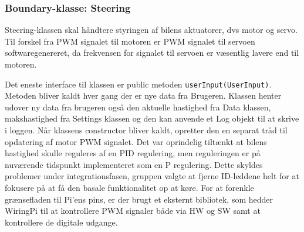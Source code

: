 \subsubsection{Boundary-klasse: Steering} 

Steering-klassen skal håndtere styringen af bilens aktuatorer, dvs motor og servo. 
Til forskel fra PWM signalet til motoren er PWM signalet til servoen softwaregenereret, da frekvensen for signalet til servoen er væsentlig lavere end til motoren.

Det eneste interface til klassen er public metoden \texttt{userInput(UserInput)}. 
Metoden bliver kaldt hver gang der er nye data fra Brugeren. 
Klassen henter udover ny data fra brugeren også den aktuelle hastighed fra Data klassen, makshastighed fra Settings klassen og den kan anvende et Log objekt til at skrive i loggen.
Når klassens constructor bliver kaldt, opretter den en separat tråd til opdatering af motor PWM signalet. 
Det var oprindelig tiltænkt at bilens hastighed skulle reguleres af en PID regulering, men reguleringen er på nuværende tidspunkt implementeret som en P regulering.
Dette skyldes problemer under integrationsfasen, gruppen valgte at fjerne ID-leddene helt for at fokusere på at få den basale funktionalitet op at køre.
For at forenkle grænsefladen til Pi'ens pins, er der brugt et eksternt bibliotek, som hedder WiringPi \cite{lib:wiringpi} til at kontrollere PWM signaler både via HW og SW samt at kontrollere de digitale udgange. 